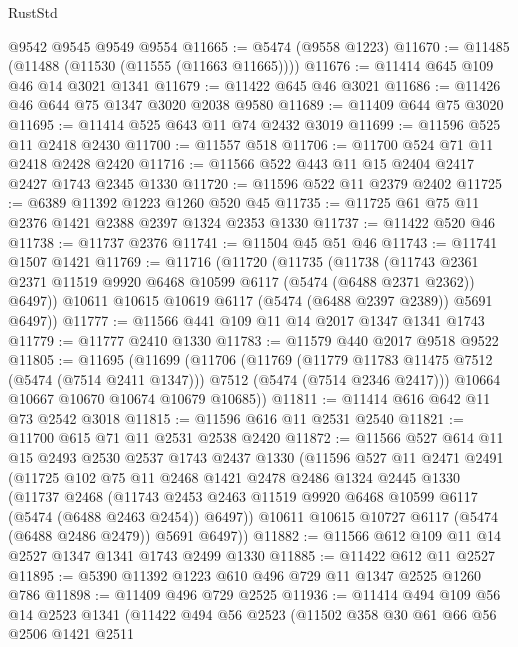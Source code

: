 \begin{lexlean}{RustStd}
\begin{coremodule}
    @9542
    @9545
    @9549
    @9554
@11665 := @5474 (@9558 @1223)
@11670 := @11485 (@11488 (@11530 (@11555 (@11663 @11665))))
@11676 := @11414 @645 @109 @46 @14 @3021 @1341
@11679 := @11422 @645 @46 @3021
@11686 := @11426 @46 @644 @75 @1347 @3020 @2038 @9580
@11689 := @11409 @644 @75 @3020
@11695 := @11414 @525 @643 @11 @74 @2432 @3019
@11699 := @11596 @525 @11 @2418 @2430
@11700 := @11557 @518
@11706 := @11700 @524 @71 @11 @2418 @2428 @2420
@11716 := @11566 @522 @443 @11 @15 @2404 @2417 @2427 @1743 @2345 @1330
@11720 := @11596 @522 @11 @2379 @2402
@11725 := @6389 @11392 @1223 @1260 @520 @45
@11735 := @11725 @61 @75 @11 @2376 @1421 @2388 @2397 @1324 @2353 @1330
@11737 := @11422 @520 @46
@11738 := @11737 @2376
@11741 := @11504 @45 @51 @46
@11743 := @11741 @1507 @1421
@11769 := @11716
    (@11720
      (@11735
        (@11738
          (@11743 @2361 @2371 @11519 @9920 @6468 @10599 @6117 (@5474 (@6488 @2371 @2362)) @6497))
        @10611
        @10615
        @10619
        @6117
        (@5474 (@6488 @2397 @2389))
        @5691
        @6497))
@11777 := @11566 @441 @109 @11 @14 @2017 @1347 @1341 @1743
@11779 := @11777 @2410 @1330
@11783 := @11579 @440 @2017 @9518 @9522
@11805 := @11695
    (@11699
      (@11706
        (@11769
          (@11779 @11783 @11475 @7512 (@5474 (@7514 @2411 @1347)))
          @7512
          (@5474 (@7514 @2346 @2417)))
        @10664
        @10667
        @10670
        @10674
        @10679
        @10685))
@11811 := @11414 @616 @642 @11 @73 @2542 @3018
@11815 := @11596 @616 @11 @2531 @2540
@11821 := @11700 @615 @71 @11 @2531 @2538 @2420
@11872 := @11566
    @527
    @614
    @11
    @15
    @2493
    @2530
    @2537
    @1743
    @2437
    @1330
    (@11596
      @527
      @11
      @2471
      @2491
      (@11725
        @102
        @75
        @11
        @2468
        @1421
        @2478
        @2486
        @1324
        @2445
        @1330
        (@11737
          @2468
          (@11743 @2453 @2463 @11519 @9920 @6468 @10599 @6117 (@5474 (@6488 @2463 @2454)) @6497))
        @10611
        @10615
        @10727
        @6117
        (@5474 (@6488 @2486 @2479))
        @5691
        @6497))
@11882 := @11566 @612 @109 @11 @14 @2527 @1347 @1341 @1743 @2499 @1330
@11885 := @11422 @612 @11 @2527
@11895 := @5390 @11392 @1223 @610 @496 @729 @11 @1347 @2525 @1260 @786
@11898 := @11409 @496 @729 @2525
@11936 := @11414
    @494
    @109
    @56
    @14
    @2523
    @1341
    (@11422
      @494
      @56
      @2523
      (@11502
        @358
        @30
        @61
        @66
        @56
        @2506
        @1421
        @2511

\end{coremodule}
\end{lexlean}
